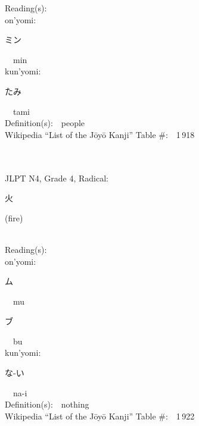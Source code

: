 \begin{multicols}{2}
Reading(s):\ \ \\
{\hspace*{1em}}on'yomi:\ \ \\
{\hspace*{2em}}{\begin{CJK}{UTF8}{min} ミン \end{CJK}}\ \ min\ \ \\
{\hspace*{1em}}kun'yomi:\ \ \\
{\hspace*{2em}}{\begin{CJK}{UTF8}{min} たみ \end{CJK}}\ \ tami\ \ \\
Definition(s):\ \ people \\
Wikipedia ``List of the J\=oy\=o Kanji'' Table \#:\ \ 1\,918 \\
\ \ \\
{\fontsize{34pt}{40pt}  }\ \ \\  %
{JLPT N4, Grade 4, Radical:\ \ {\begin{CJK}{UTF8}{min} 火 \end{CJK}} (fire) } \\
Reading(s):\ \ \\
{\hspace*{1em}}on'yomi:\ \ \\
{\hspace*{2em}}{\begin{CJK}{UTF8}{min} ム \end{CJK}}\ \ mu\ \ \\
{\hspace*{2em}}{\begin{CJK}{UTF8}{min} ブ \end{CJK}}\ \ bu\ \ \\
{\hspace*{1em}}kun'yomi:\ \ \\
{\hspace*{2em}}{\begin{CJK}{UTF8}{min} な-い \end{CJK}}\ \ na-i\ \ \\
Definition(s):\ \ nothing \\
Wikipedia ``List of the J\=oy\=o Kanji'' Table \#:\ \ 1\,922 \\
\ \ \\

\end{multicols}
